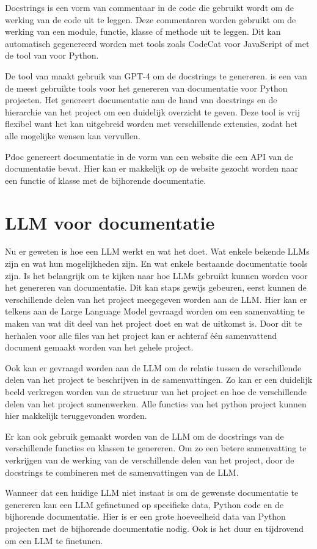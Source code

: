 Docstrings is een vorm van commentaar in de code die gebruikt wordt om de werking van de code uit te leggen.
Deze commentaren worden gebruikt om de werking van een module, functie, klasse of methode uit te leggen.
Dit kan automatisch gegenereerd worden met tools zoals CodeCat \autocite{CodeCat2024} voor JavaScript of met de tool van \textcite{Trofficus2023} voor Python.

De tool van \textcite{Trofficus2023} maakt gebruik van GPT-4 \autocite{OpenAI2023} om de docstrings te genereren.
\textcite{Sphinx2023} is een van de meest gebruikte tools voor het genereren van documentatie voor Python projecten.
Het genereert documentatie aan de hand van docstrings en de hierarchie van het project om een duidelijk overzicht te geven.
Deze tool is vrij flexibel want het kan uitgebreid worden met verschillende extensies, zodat het alle mogelijke wensen kan vervullen.

Pdoc \autocite{GallantHils2023} genereert documentatie in de vorm van een website die een API van de documentatie bevat. 
Hier kan er makkelijk op de website gezocht worden naar een functie of klasse met de bijhorende documentatie.

\section{LLM voor documentatie}
\label{sec:llm-voor-documentatie}

Nu er geweten is hoe een LLM werkt en wat het doet. Wat enkele bekende LLMs zijn en wat hun mogelijkheden zijn. 
En wat enkele bestaande documentatie tools zijn.
Is het belangrijk om te kijken naar hoe LLMs gebruikt kunnen worden voor het genereren van documentatie.
Dit kan staps gewijs gebeuren, eerst kunnen de verschillende delen van het project meegegeven worden aan de LLM. 
Hier kan er telkens aan de Large Language Model gevraagd worden om een samenvatting te maken van wat dit deel van het project doet en wat de uitkomst is.
Door dit te herhalen voor alle files van het project kan er achteraf één samenvattend document gemaakt worden van het gehele project.

Ook kan er gevraagd worden aan de LLM om de relatie tussen de verschillende delen van het project te beschrijven in de samenvattingen.
Zo kan er een duidelijk beeld verkregen worden van de structuur van het project en hoe de verschillende delen van het project samenwerken.
Alle functies van het python project kunnen hier makkelijk teruggevonden worden.

Er kan ook gebruik gemaakt worden van de LLM om de docstrings van de verschillende functies en klassen te genereren. 
Om zo een betere samenvatting te verkrijgen van de werking van de verschillende delen van het project, door de docstrings te combineren met de samenvattingen van de LLM.

Wanneer dat een huidige LLM niet instaat is om de gewenste documentatie te genereren kan een LLM gefinetuned op specifieke data, Python code en de bijhorende documentatie.
Hier is er een grote hoeveelheid data van Python projecten met de bijhorende documentatie nodig. Ook is het duur en tijdrovend om een LLM te finetunen.